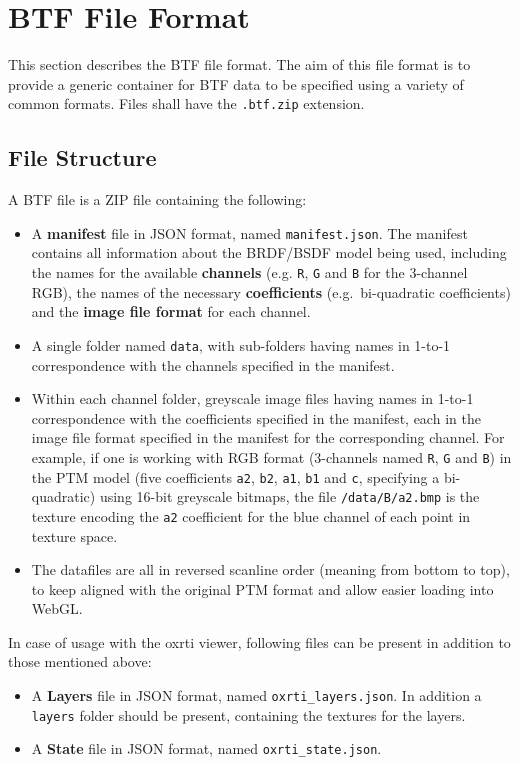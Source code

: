 \hypertarget{btf-file-format}{%
\section{BTF File Format}\label{sec_fileformat}}

This section describes the BTF file format. The aim of this file format
is to provide a generic container for BTF data to be specified using a
variety of common formats. Files shall have the \texttt{.btf.zip}
extension.

\hypertarget{file-structure}{%
\subsection{File Structure}\label{file-structure}}

A BTF file is a ZIP file containing the following:
\begin{itemize}
\item A \textbf{manifest}
file in JSON format, named \texttt{manifest.json}. The manifest contains
all information about the BRDF/BSDF model being used, including the
names for the available \textbf{channels} (e.g. \texttt{R}, \texttt{G}
and \texttt{B} for the 3-channel RGB), the names of the necessary
\textbf{coefficients} (e.g.~bi-quadratic coefficients) and the
\textbf{image file format} for each channel.
\item A single folder named
\texttt{data}, with sub-folders having names in 1-to-1 correspondence
with the channels specified in the manifest.
\item Within each channel
folder, greyscale image files having names in 1-to-1 correspondence with
the coefficients specified in the manifest, each in the image file
format specified in the manifest for the corresponding channel. For
example, if one is working with RGB format (3-channels named \texttt{R},
\texttt{G} and \texttt{B}) in the PTM model (five coefficients
\texttt{a2}, \texttt{b2}, \texttt{a1}, \texttt{b1} and \texttt{c},\!
specifying a bi-quadratic) using 16-bit greyscale bitmaps, the file
\texttt{/data/B/a2.bmp} is the texture encoding the \texttt{a2}
coefficient for the blue channel of each point in texture space.
\item The
datafiles are all in reversed scanline order (meaning from bottom to
top), to keep aligned with the original PTM format and allow easier
loading into WebGL.
\end{itemize}

In case of usage with the oxrti viewer, following files can be present in
addition to those mentioned above:
\begin{itemize}
\item A \textbf{Layers} file in JSON format, named \texttt{oxrti\_layers.json}.
  In addition a \texttt{layers} folder should be present, containing the
  textures for the layers.
\item A \textbf{State} file in JSON format, named \texttt{oxrti\_state.json}.

\end{itemize}

